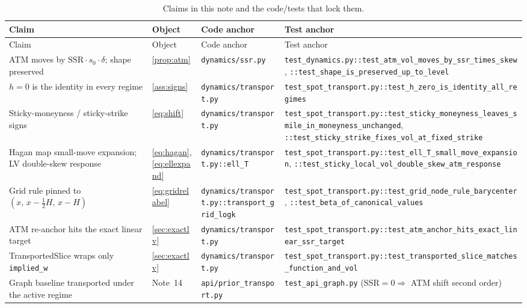 \documentclass[11pt]{article}
\begin{document}
\begingroup
\small
\setlength{\tabcolsep}{3pt}
\begin{longtable}{@{}p{}p{}p{}p{}@{}}
\caption{Claims in this note and the code/tests that lock them.}\\
\toprule Claim & Object & Code anchor & Test anchor\\ \midrule
\endfirsthead
\toprule Claim & Object & Code anchor & Test anchor\\ \midrule
\endhead
ATM moves by $\mathrm{SSR}\cdot s_0\cdot\delta$; shape preserved &
\cref{prop:atm} &
\nolinkurl{dynamics/ssr.py} &
\nolinkurl{test_dynamics.py::test_atm_vol_moves_by_ssr_times_skew}, \nolinkurl{::test_shape_is_preserved_up_to_level}\\
$h=0$ is the identity in every regime &
\cref{ass:signs} &
\nolinkurl{dynamics/transport.py} &
\nolinkurl{test_spot_transport.py::test_h_zero_is_identity_all_regimes}\\
Sticky-moneyness / sticky-strike signs &
\eqref{eq:shift} &
\nolinkurl{dynamics/transport.py} &
\nolinkurl{test_spot_transport.py::test_sticky_moneyness_leaves_smile_in_moneyness_unchanged}, \nolinkurl{::test_sticky_strike_fixes_vol_at_fixed_strike}\\
Hagan map small-move expansion; LV double-skew response &
\eqref{eq:hagan}, \eqref{eq:ellexpand} &
\nolinkurl{dynamics/transport.py::ell_T} &
\nolinkurl{test_spot_transport.py::test_ell_T_small_move_expansion}, \nolinkurl{::test_sticky_local_vol_double_skew_atm_response}\\
Grid rule pinned to $(x,\,x-\tfrac12H,\,x-H)$ &
\eqref{eq:gridrelabel} &
\nolinkurl{dynamics/transport.py::transport_grid_logk} &
\nolinkurl{test_spot_transport.py::test_grid_node_rule_barycenter}, \nolinkurl{::test_beta_of_canonical_values}\\
ATM re-anchor hits the exact linear target &
\cref{sec:exactlv} &
\nolinkurl{dynamics/transport.py} &
\nolinkurl{test_spot_transport.py::test_atm_anchor_hits_exact_linear_ssr_target}\\
TransportedSlice wraps only \texttt{implied\_w} &
\cref{sec:exactlv} &
\nolinkurl{dynamics/transport.py} &
\nolinkurl{test_spot_transport.py::test_transported_slice_matches_function_and_vol}\\
Graph baseline transported under the active regime &
Note~14 &
\nolinkurl{api/prior_transport.py} &
\nolinkurl{test_api_graph.py} (SSR$=0\Rightarrow$ ATM shift second order)\\
\bottomrule
\end{longtable}
\endgroup
\end{document}
